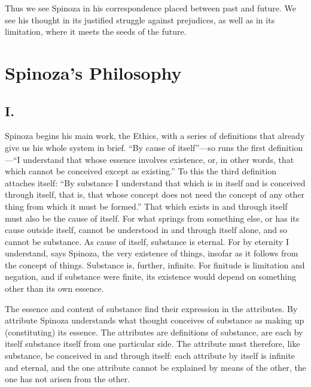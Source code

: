 \documentclass[12pt]{book}
\newcommand{\opage}[1]{\marginnote{\footnotesize\textit{[#1]}}}
\begin{document}
Thus we see Spinoza in his correspondence placed between past and future. We see his
thought in its justified struggle against prejudices, as well as in its limitation,
where it meets the seeds of the future.

\chapter*{Spinoza's Philosophy}

\section*{I.}
\opage{72}Spinoza begins his main work, the Ethics, with a series of definitions that
already give us his whole system in brief. ``By cause of itself''---so runs the first
definition---``I understand that whose essence involves existence, or, in other words,
that which cannot be conceived except as existing.'' To this the third definition
attaches itself: ``By substance I understand that which is in itself and is conceived
through itself, that is, that whose concept does not need the concept of any other
thing from which it must be formed.'' That which exists in and through itself must also
be the cause of itself. For what springs from something else, or has its cause outside
itself, cannot be understood in and through itself alone, and so cannot be substance.
As cause of itself, substance is eternal. For by eternity I understand, says Spinoza,
the very existence of things, insofar as it follows from the concept of things.
Substance is, further, infinite. For finitude is limitation and negation, \opage{73}and
if substance were finite, its existence would depend on something other than its own
essence.

The essence and content of substance find their expression in the attributes. By
attribute Spinoza understands what thought conceives of substance as making up
(constituting) its essence. The attributes are definitions of substance, are each by
itself substance itself from one particular side. The attribute must therefore, like
substance, be conceived in and through itself: each attribute by itself is infinite and
eternal, and the one attribute cannot be explained by means of the other, the one has
not arisen from the other.
\end{document}
